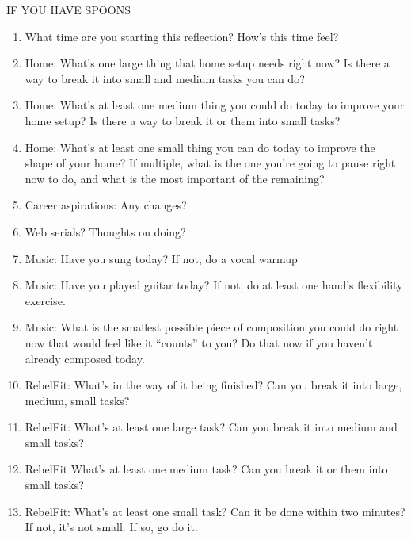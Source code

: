 \documentclass[12pt]{article}
\newcommand{\say}[1]{``#1''}
\renewcommand{\,}{\textsuperscript{,}}
\begin{document}
 
IF YOU HAVE SPOONS

\begin{enumerate}

\item What time are you starting this reflection? How's this time feel?

\item Home: What's one large thing that home setup needs right now? Is there a way to break it into small and medium tasks you can do?

\item Home: What's at least one medium thing you could do today to improve your home setup? Is there a way to break it or them into small tasks?

\item Home: What's at least one small thing you can do today to improve the shape of your home? If multiple, what is the one you're going to pause right now to do, and what is the most important of the remaining?

\item Career aspirations: Any changes?

\item Web serials? Thoughts on doing?

\item Music: Have you sung today? If not, do a vocal warmup

\item Music: Have you played guitar today? If not, do at least one hand's flexibility exercise.

\item Music: What is the smallest possible piece of composition you could do right now that would feel like it \say{counts} to you? Do that now if you haven't already composed today.

\item RebelFit: What's in the way of it being finished? Can you break it into large, medium, small tasks?

\item RebelFit: What's at least one large task? Can you break it into medium and small tasks?

\item RebelFit What's at least one medium task? Can you break it or them into small tasks?

\item RebelFit: What's at least one small task? Can it be done within two minutes? If not, it's not small. If so, go do it.


\end{enumerate}
\end{document}
